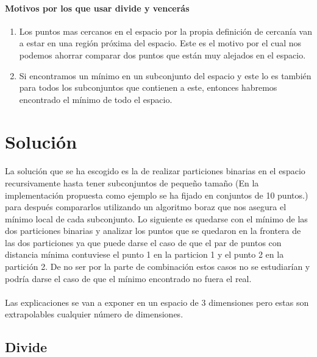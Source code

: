 \documentclass{article}
\begin{document}
	\paragraph{Motivos por los que usar divide y vencerás}

		\begin{enumerate}

			\item
			Los puntos mas cercanos en el espacio por la propia definición de cercanía van a estar en una región próxima del espacio. Este es el motivo por el cual nos podemos ahorrar comparar dos puntos que están muy alejados en el espacio.
			\item
			Si encontramos un mínimo en un subconjunto del espacio y este lo es también para todos los subconjuntos que contienen a este, entonces habremos encontrado el mínimo de todo el espacio.

		\end{enumerate}

\section{Solución}

	\paragraph{}
	La solución que se ha escogido es la de realizar particiones binarias en el espacio recursivamente hasta tener subconjuntos de pequeño tamaño (En la implementación propuesta como ejemplo se ha fijado en conjuntos de 10 puntos.) para después compararlos utilizando un algoritmo boraz que nos asegura el mínimo local de cada subconjunto. Lo siguiente es quedarse con el mínimo de las dos particiones binarias y analizar los puntos que se quedaron en la frontera de las dos particiones ya que puede darse el caso de que el par de puntos con distancia mínima contuviese el punto 1 en la particion 1 y el punto 2 en la partición 2. De no ser por la parte de combinación estos casos no se estudiarían y podría darse el caso de que el mínimo encontrado no fuera el real.

	\paragraph{}
	Las explicaciones se van a exponer en un espacio de 3 dimensiones pero estas son extrapolables cualquier número de dimensiones.

	\subsection{Divide}
\end{document}
